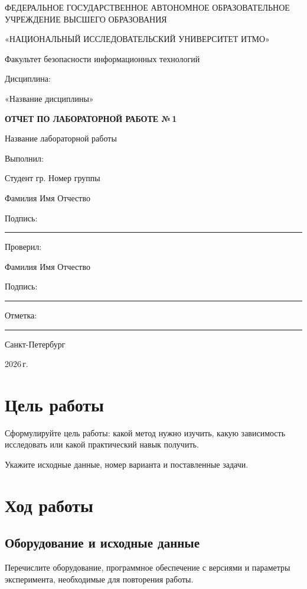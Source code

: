 \documentclass[a4paper,14pt]{extarticle}
\newif\ifNewSectionPage
\newcommand{\University}{«НАЦИОНАЛЬНЫЙ ИССЛЕДОВАТЕЛЬСКИЙ УНИВЕРСИТЕТ ИТМО»}
\newcommand{\Faculty}{Факультет безопасности информационных технологий}
\newcommand{\Discipline}{Название дисциплины}
\newcommand{\LabNumber}{1}
\newcommand{\LabTitle}{Название лабораторной работы}
\newcommand{\Group}{Номер группы}
\newcommand{\Student}{Фамилия Имя Отчество}
\newcommand{\Teacher}{Фамилия Имя Отчество}
\newcommand{\City}{Санкт-Петербург}
\newcommand{\ReportYear}{2026}
\newcommand{\LabSection}[1]{%
  \ifNewSectionPage\clearpage\fi\section{#1}}
\begin{document}
\begin{titlepage}
\thispagestyle{empty}
\setlength{\parindent}{0pt}
\begin{center}
ФЕДЕРАЛЬНОЕ ГОСУДАРСТВЕННОЕ АВТОНОМНОЕ
ОБРАЗОВАТЕЛЬНОЕ УЧРЕЖДЕНИЕ ВЫСШЕГО ОБРАЗОВАНИЯ\par
\University\par
\vspace{10mm}
\Faculty\par
\vfill
Дисциплина:\par
«\Discipline»\par
\vspace{12mm}
\textbf{ОТЧЕТ ПО ЛАБОРАТОРНОЙ РАБОТЕ №\,\LabNumber}\par
\LabTitle\par
\vfill
\end{center}
\begin{flushright}
\begin{minipage}{0.55\textwidth}
\raggedleft
Выполнил:\par
Студент гр. \Group\par
\Student\par
Подпись: \rule{35mm}{0.4pt}\par
\vspace{8mm}
Проверил:\par
\Teacher\par
Подпись: \rule{35mm}{0.4pt}\par
Отметка: \rule{35mm}{0.4pt}\par
\end{minipage}
\end{flushright}
\vfill
\begin{center}
\City\par
\ReportYear\,г.
\end{center}
\end{titlepage}
\setcounter{page}{2}


\LabSection{Цель работы}
Сформулируйте цель работы: какой метод нужно изучить, какую зависимость
исследовать или какой практический навык получить.

Укажите исходные данные, номер варианта и поставленные задачи.

\LabSection{Ход работы}
\subsection{Оборудование и исходные данные}
Перечислите оборудование, программное обеспечение с версиями и параметры
эксперимента, необходимые для повторения работы.
\end{document}

